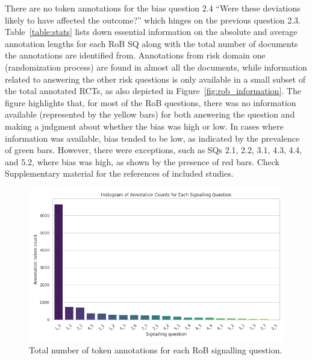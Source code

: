\documentclass[sn-mathphys,Numbered]{sn-jnl}%
\theoremstyle{thmstyleone}%
\theoremstyle{thmstyletwo}%
\theoremstyle{thmstylethree}%
\begin{document}
 
There are no token annotations for the bias question 2.4 ``Were these deviations likely to have affected the outcome?'' which hinges on the previous question 2.3.
Table~\ref{table:stats} lists down essential information on the absolute and average annotation lengths for each RoB SQ along with the total number of documents the annotations are identified from.
Annotations from risk domain one (randomization process) are found in almost all the documents, while information related to answering the other risk questions is only available in a small subset of the total annotated RCTs, as also depicted in Figure~\ref{fig:rob_information}.
The figure highlights that, for most of the RoB questions, there was no information available (represented by the yellow bars) for both answering the question and making a judgment about whether the bias was high or low.
In cases where information was available, bias tended to be low, as indicated by the prevalence of green bars. 
However, there were exceptions, such as SQs 2.1, 2.2, 3.1, 4.3, 4.4, and 5.2, where bias was high, as shown by the presence of red bars.
Check Supplementary material for the references of included studies. %
%
%
%
\begin{figure}[htb]
    \centering
    \includegraphics[width=0.90\columnwidth]{figures/sq_ann_raw_counts.png}
    \caption{Total number of token annotations for each RoB signalling question.}
    \label{fig:ann_counts}
\end{figure}
%
%
%
\end{document}
